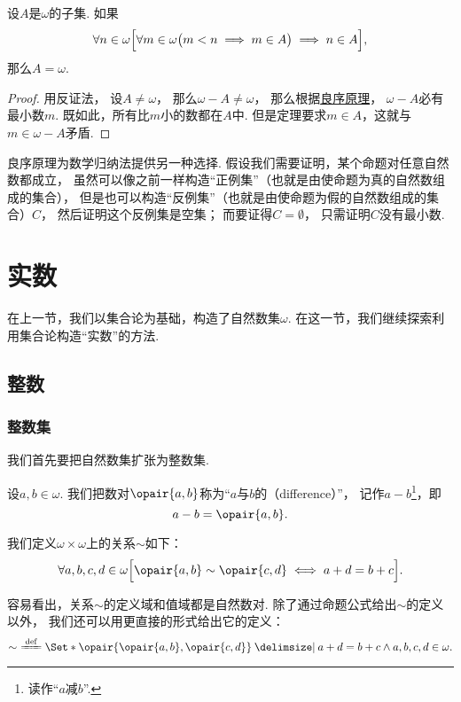 \begin{theorem}[强归纳原理]\label{theorem:集合论.归纳原理2}
设\(A\)是\(\omega\)的子集.
如果\[
	\forall n \in \omega \Bigl[
		\forall m \in \omega \bigl( m < n \implies m \in A \bigr)
		\implies
		n \in A
	\Bigr],
\]
那么\(A = \omega\).
\begin{proof}
用反证法，
设\(A \neq \omega\)，
那么\(\omega - A \neq \omega\)，
那么根据\hyperref[theorem:集合论.自然数集的良序]{良序原理}，
\(\omega - A\)必有最小数\(m\).
既如此，所有比\(m\)小的数都在\(A\)中.
但是定理要求\(m \in A\)，这就与\(m \in \omega - A\)矛盾.
\end{proof}
\end{theorem}

良序原理为数学归纳法提供另一种选择.
假设我们需要证明，某个命题对任意自然数都成立，
虽然可以像之前一样构造“正例集”（也就是由使命题为真的自然数组成的集合），
但是也可以构造“反例集”（也就是由使命题为假的自然数组成的集合）\(C\)，
然后证明这个反例集是空集；
而要证得\(C = \emptyset\)，
只需证明\(C\)没有最小数.

\section{实数}
在上一节，我们以集合论为基础，构造了自然数集\(\omega\).
在这一节，我们继续探索利用集合论构造“实数”的方法.

\subsection{整数}
\subsubsection{整数集}
我们首先要把自然数集扩张为整数集.

设\(a,b\in\omega\).
我们把数对\(\opair{a,b}\)称为“\(a\)与\(b\)的（difference）”，
记作\(a-b\)\footnote{读作“\(a\)减\(b\)”.}，即\[
	a-b = \opair{a,b}.
\]

\begin{definition}\label{definition:集合论.自然数的差的等价关系}
我们定义\(\omega\times\omega\)上的关系\(\sim\)如下：
\[
	\forall a,b,c,d \in \omega \Bigl[
		\opair{a,b} \sim \opair{c,d}
		\iff
		a+d=b+c
	\Bigr].
\]
\end{definition}

容易看出，关系\(\sim\)的定义域和值域都是自然数对.
除了通过命题公式给出\(\sim\)的定义以外，
我们还可以用更直接的形式给出它的定义：
\[
	\sim\ \defeq \Set*{
		\opair{\opair{a,b},\opair{c,d}}
		\given
		a+d=b+c \land a,b,c,d\in\omega
	}.
\]

